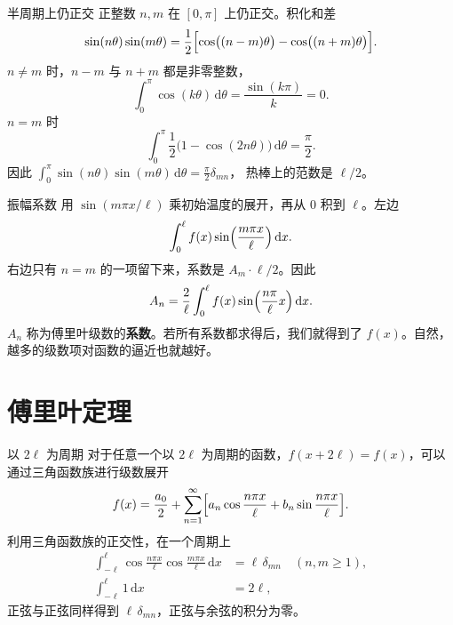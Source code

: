 \documentclass[fontset=windows, chinese, 10pt, xcolor=dvipsnames]{beamer}
\begin{document}
\begin{frame}{半周期上仍正交}
  正整数 $n,m$ 在 $[0,\pi]$ 上仍正交。积化和差
  \begin{equation*}
    \sin(n\theta)\sin(m\theta)
    =\frac12\Bigl[
      \cos\bigl((n-m)\theta\bigr)
      -\cos\bigl((n+m)\theta\bigr)
    \Bigr].
  \end{equation*}
  $n\neq m$ 时，$n-m$ 与 $n+m$ 都是非零整数，
  \begin{equation*}
    \int_0^{\pi}\cos(k\theta)\,\mathrm{d}\theta
    =\frac{\sin(k\pi)}{k}=0.
  \end{equation*}
  $n=m$ 时
  \begin{equation*}
    \int_0^{\pi}\frac12\bigl(1-\cos(2n\theta)\bigr)\,\mathrm{d}\theta
    =\frac{\pi}{2}.
  \end{equation*}
  因此 $\displaystyle\int_0^{\pi}\sin(n\theta)\sin(m\theta)\,\mathrm{d}\theta=\tfrac{\pi}{2}\delta_{mn}$，
  热棒上的范数是 $\ell/2$。
\end{frame}

\begin{frame}{振幅系数}
  用 $\sin(m\pi x/\ell)$ 乘初始温度的展开，再从 $0$ 积到 $\ell$。左边
  \begin{equation*}
    \int_0^{\ell} f(x)\sin\Bigl(\frac{m\pi x}{\ell}\Bigr)\,\mathrm{d}x.
  \end{equation*}
  右边只有 $n=m$ 的一项留下来，系数是 $A_m\cdot\ell/2$。因此
  \begin{equation*}
    A_n=\frac{2}{\ell}\int_0^{\ell}
      f(x)\sin\Bigl(\frac{n\pi}{\ell}x\Bigr)\,\mathrm{d}x.
  \end{equation*}
  $A_n$ 称为傅里叶级数的\textbf{系数}。若所有系数都求得后，我们就得到了 $f(x)$。自然，越多的级数项对函数的逼近也就越好。
\end{frame}

\section{傅里叶定理}

\begin{frame}{以 $2\ell$ 为周期}
  对于任意一个以 $2\ell$ 为周期的函数，$f(x+2\ell)=f(x)$，可以通过三角函数族进行级数展开
  \begin{equation*}
    f(x)=\frac{a_0}{2}+\sum_{n=1}^{\infty}
      \Bigl[
        a_n\cos\frac{n\pi x}{\ell}
        +b_n\sin\frac{n\pi x}{\ell}
      \Bigr].
  \end{equation*}
  利用三角函数族的正交性，在一个周期上
  \begin{align*}
    \int_{-\ell}^{\ell}
      \cos\frac{n\pi x}{\ell}
      \cos\frac{m\pi x}{\ell}\,\mathrm{d}x
      &=\ell\,\delta_{mn}
      \quad(n,m\geq 1),\\
    \int_{-\ell}^{\ell} 1\,\mathrm{d}x&=2\ell,
  \end{align*}
  正弦与正弦同样得到 $\ell\,\delta_{mn}$，正弦与余弦的积分为零。
\end{frame}
\end{document}
